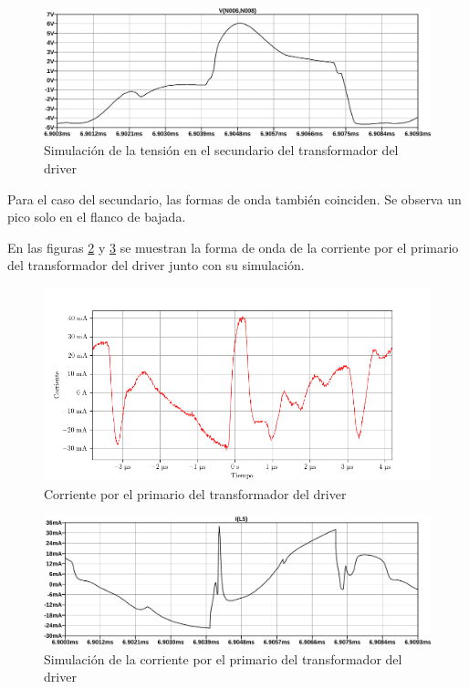 \begin{figure}[H]
    \centering
    \includegraphics[width=\textwidth]{images/sim/5.pdf}
    \caption{Simulación de la tensión en el secundario del transformador del driver}
    \label{fig:sim:5}
\end{figure}

Para el caso del secundario, las formas de onda también coinciden. 
Se observa un pico solo en el flanco de bajada.

En las figuras \ref{fig:osc:11} y \ref{fig:sim:6} se muestran la forma de onda de la corriente por el primario del transformador del driver junto con su simulación.

\begin{figure}[H]
    \centering
    \includegraphics[width=\textwidth]{images/capturas-osciloscopio/17-11-2022/11.png}
    \caption{Corriente por el primario del transformador del driver}
    \label{fig:osc:11}
\end{figure}

\begin{figure}[H]
    \centering
    \includegraphics[width=\textwidth]{images/sim/6.pdf}
    \caption{Simulación de la corriente por el primario del transformador del driver}
    \label{fig:sim:6}
\end{figure}

